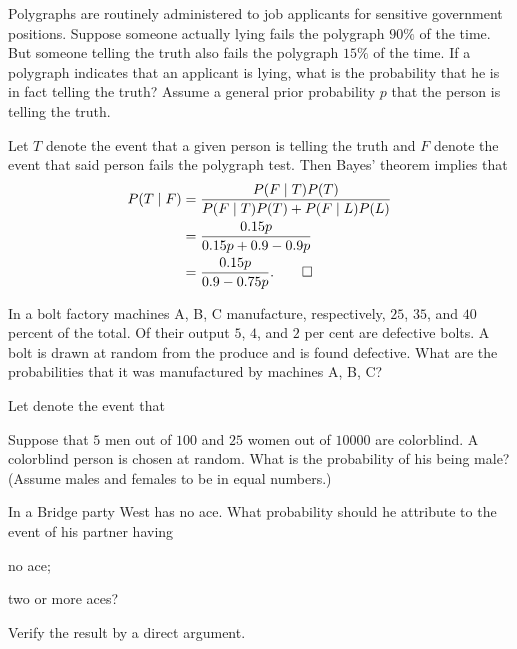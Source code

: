 \begin{problem}
   Polygraphs are routinely administered to job
  applicants for sensitive government positions. Suppose someone actually
  lying fails the polygraph \(90\%\) of the time. But someone telling the
  truth also fails the polygraph \(15\%\) of the time. If a polygraph
  indicates that an applicant is lying, what is the probability that he is
  in fact telling the truth? Assume a general prior probability \(p\) that
  the person is telling the truth.
\end{problem}
\begin{solution*}
  Let \(T\) denote the event that a given person is telling the truth and
  \(F\) denote the event that said person fails the polygraph test. Then
  Bayes' theorem implies that
  \begin{align*}
    P(T\mid F)
    &=\frac{P(F\mid T)P(T)}{P(F\mid T)P(T) + P(F\mid L)P(L)}\\
    &=\frac{0.15p}{0.15p + 0.9 - 0.9p}\\
    &=\frac{0.15p}{0.9-0.75p}.\qedhere
  \end{align*}
\end{solution*}

\begin{problem}[Handout 4, \# 8]
  In a bolt factory machines A, B, C manufacture, respectively, \(25\),
  \(35\), and \(40\) percent of the total. Of their output \(5\), \(4\),
  and \(2\) per cent are defective bolts. A bolt is drawn at random from
  the produce and is found defective. What are the probabilities that it
  was manufactured by machines A, B, C?
\end{problem}
\begin{solution*}
  Let denote the event that
\end{solution*}

\begin{problem}[Handout 4, \# 9]
  Suppose that \(5\) men out of \(100\) and \(25\) women out of \(10000\)
  are colorblind. A colorblind person is chosen at random. What is the
  probability of his being male? (Assume males and females to be in equal
  numbers.)
\end{problem}
\begin{solution*}
\end{solution*}

\begin{problem}
  In a Bridge party West has no ace. What probability should he attribute
  to the event of his partner having
  \begin{alphlist}
  \item no ace;
  \item two or more aces?
  \end{alphlist}
  Verify the result by a direct argument.
\end{problem}
\begin{solution*}
\end{solution*}

